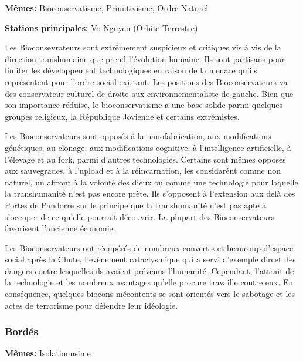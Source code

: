                                     \textbf{Mêmes:} Bioconservatisme, Primitivisme, Ordre Naturel 

                                    \textbf{Stations principales:} Vo Nguyen (Orbite Terrestre) 

                                    Les Bioconsevrateurs sont extrêmement suspicieux et critiques vis à vis de la direction transhumaine que prend l'évolution humaine. Ils sont partisans pour limiter les développement technologiques en raison de la menace qu'ils représentent pour l'ordre social existant. Les positions des Bioconservateurs va des conservateur culturel de droite aux environnementaliste de gauche. Bien que son importance réduise, le bioconservatisme a une base solide parmi quelques groupes religieux, la République Jovienne et certains extrémistes. 

                                    Les Bioconservateurs sont opposés à la nanofabrication, aux modifications génétiques, au clonage, aux modifications cognitive, à l'intelligence artificielle, à l'élevage et au fork, parmi d'autres technologies. Certains sont mêmes opposés aux sauvegrades, à l'upload et à la réincarnation, les considarént comme non naturel, un affront à la volonté des dieux ou comme une technologie pour laquelle la transhumanité n'est pas encore prète. Ils s'opposent à l'extension aux delà des Portes de Pandorre sur le principe que la transhumanité n'est pas apte à s'occuper de ce qu'elle pourrait découvrir. La plupart des Bioconservateurs favorisent l'ancienne économie. 

                                    Les Bioconservateurs ont récupérés de nombreux convertis et beaucoup d'espace social après la Chute, l'évènement cataclysmique qui a servi d'exemple dircet des dangers contre lesquelles ils avaient prévenus l'humanité. Cependant, l'attrait de la technologie et les nombreux avantages qu'elle procure travaille contre eux. En conséquence, quelques biocons mécontents se sont orientés vers le sabotage et les actes de terrorisme pour défendre leur idéologie. 

                                    \subsubsection{Bordés} \label{sec:brinkers} 

                                    \textbf{Mêmes:} Isolationnsime 


